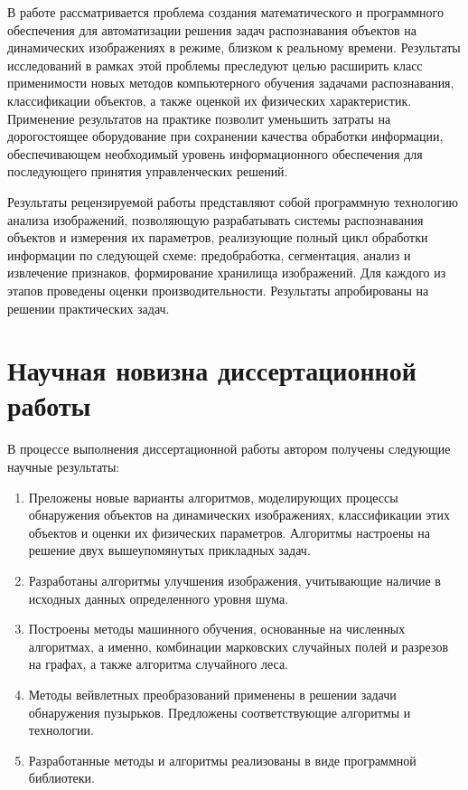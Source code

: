 \documentclass[12pt]{extarticle}
\begin{document}
В работе рассматривается проблема создания математического и программного обеспечения для автоматизации решения задач распознавания объектов на динамических изображениях в режиме, близком к реальному времени.  Результаты исследований в рамках этой проблемы преследуют целью расширить класс применимости новых методов компьютерного обучения задачами распознавания, классификации объектов, а также оценкой их физических характеристик.  Применение результатов на практике позволит уменьшить затраты на дорогостоящее оборудование при сохранении качества обработки информации, обеспечивающем необходимый уровень информационного обеспечения для последующего принятия управленческих решений.

Результаты рецензируемой работы представляют собой программную технологию анализа изображений, позволяющую разрабатывать системы распознавания объектов и измерения их параметров, реализующие полный цикл обработки информации по следующей схеме: предобработка, сегментация, анализ и извлечение признаков, формирование хранилища изображений.  Для каждого из этапов проведены оценки производительности.  Результаты апробированы на решении практических задач.

\section{Научная новизна диссертационной работы}
\label{sec:sci-new}

В процессе выполнения диссертационной работы автором получены следующие научные результаты:
\begin{enumerate}
\item Преложены новые варианты алгоритмов, моделирующих процессы обнаружения объектов на динамических изображениях, классификации этих объектов и оценки их физических параметров.  Алгоритмы настроены на решение двух вышеупомянутых прикладных задач.
\item Разработаны алгоритмы улучшения изображения, учитывающие наличие в исходных данных определенного уровня шума.
\item Построены методы машинного обучения, основанные на численных алгоритмах, а именно, комбинации марковских случайных полей и разрезов на графах, а также алгоритма случайного леса.
\item Методы вейвлетных преобразований применены в решении задачи обнаружения пузырьков. Предложены соответствующие алгоритмы и технологии.
\item Разработанные методы и алгоритмы реализованы в виде программной библиотеки.
\end{enumerate}
\end{document}
